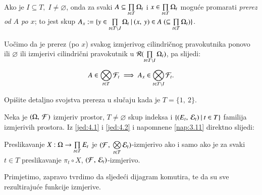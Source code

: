 \begin{defn}    \label{defn:4.6-1}
    Ako je $I \subseteq T, \; I \neq \varnothing$, onda za svaki $A \subseteq \prod\limits_{t \in T}^{} \Omega_t$ i $x \in \prod\limits_{t \in T}^{} \Omega_t$ mogu\' ce promarati \emph{prerez od $A$ po $x$}; to jest skup $A_x := \{{y \in \prod\limits_{t \in T \setminus J}^{} \Omega_t} \: | \: {(x, \: y) \in A \; (\subseteq \prod\limits_{t \in T}^{} \Omega_t)}\}$.
\end{defn}
Uo\v cimo da je prerez (po $x$) svakog izmjerivog cilindri\v cnog pravokutnika ponovo ili $\varnothing$ ili izmjerivi cilindri\v cni pravokutnik u $\mathcal{R}({\prod\limits_{t \in T \setminus I}^{} \Omega_t})$, pa slijedi:
\begin{equation}    \label{jed:4.7}
    A \in \bigotimes\limits_{t \in T}^{} \mathcal{F}_t \implies A_x \in \bigotimes\limits_{t \in T \setminus I}^{} \mathcal{F}_t.
\end{equation}

\begin{zad} \label{zad:4.8}
    Opi\v site detaljno svojstva prereza u slu\v caju kada je $T = \{1, \: 2\}$.
\end{zad}

Neka je $(\Omega, \: \mathcal{F})$ izmjeriv prostor, $T \neq \varnothing$ skup indeksa i $\{{(E_t, \: \mathcal{E}_t)} \: | \: {t \in T}\}$ familija izmjerivih prostora.
Iz \eqref{jed:4.1} i \eqref{jed:4.2} i napomnene \ref{nap:3.11} direktno slijedi:

\begin{prop} \label{prop:4.9}
    Preslikavanje $X : \Omega \to \prod\limits_{t \in T}^{} E_t$ je $(\mathcal{F}, \: \bigotimes\limits_{t \in T}^{} \mathcal{E}_t)$-izmjerivo ako i samo ako je za svaki $t \in T$ preslikavanje $\pi_t \circ X$, $(\mathcal{F}, \: \mathcal{E}_t)$-izmjerivo.
\end{prop}

Primjetimo, zapravo tvrdimo da sljede\' ci dijagram komutira, te da su sve rezultiraju\' ce funkcije izmjerive.
\begin{figure}[H]
    \centering
\end{figure}

